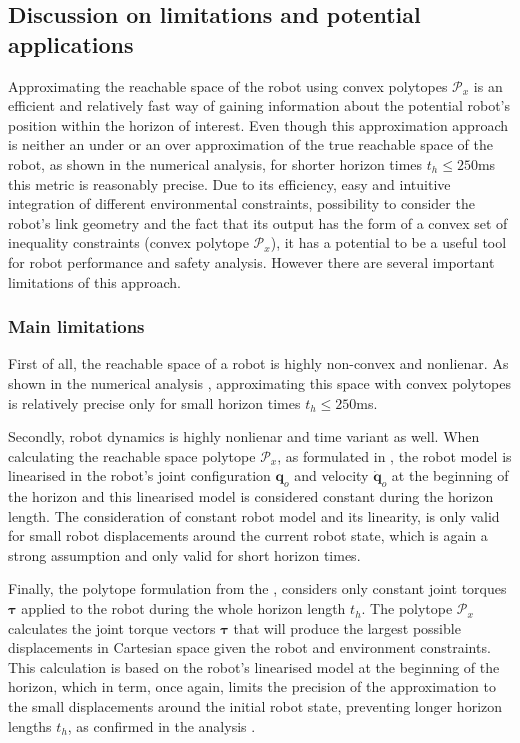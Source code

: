 \subsection{Discussion on limitations and potential applications}
\label{ch:discussion}

Approximating the reachable space of the robot using convex polytopes $\mathcal{P}_x$ is an efficient and relatively fast way of gaining information about the potential robot's position within the horizon of interest. Even though this approximation approach is neither an under or an over approximation of the true reachable space of the robot, as shown in the numerical analysis, for shorter horizon times $t_h\leq250$ms this metric is reasonably precise. Due to its efficiency, easy and intuitive integration of different environmental constraints, possibility to consider the robot's link geometry and the fact that its output has the form of a convex set of inequality constraints (convex polytope $\mathcal{P}_x$), it has a potential to be a useful tool for robot performance and safety analysis. However there are several important limitations of this approach.

\subsubsection{Main limitations }

First of all, the reachable space of a robot is highly non-convex and nonlienar. As shown in the numerical analysis , approximating this space with convex polytopes is relatively precise only for small horizon times $t_h\leq250$ms.

Secondly, robot dynamics is highly nonlienar and time variant as well. When calculating the reachable space polytope $\mathcal{P}_x$, as formulated in , the robot model is linearised in the robot's joint configuration $\bm{q}_o$ and velocity $\dot{\bm{q}}_o$  at the beginning of the horizon and this linearised model is considered constant during the horizon length. The consideration of constant robot model and its linearity, is only valid for small robot displacements around the current robot %
state, which is again a strong assumption and only valid for short horizon times. 

Finally, the polytope formulation from the , considers only constant joint torques $\bm{\tau}$ applied to the robot during the whole horizon length $t_h$. The polytope $\mathcal{P}_x$ calculates the joint torque vectors $\bm{\tau}$ that will produce the largest possible displacements in Cartesian space given the robot and environment constraints. This calculation is based on the robot's linearised model at the beginning of the horizon, which in term, once again, limits the precision of the approximation to the small displacements around the initial robot state, preventing longer horizon lengths $t_h$, as confirmed in the analysis .


